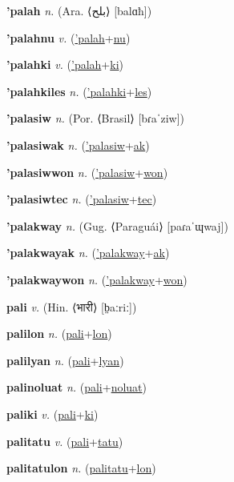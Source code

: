\textbf{\hypertarget{'palah}{'palah}} \textit{n.} (Ara. ⟨{\arabics{}بلح}⟩ [balɑħ])


\textbf{\hypertarget{'palahnu}{'palahnu}} \textit{v.} (\hyperlink{'palah}{'palah}+\allowbreak \hyperlink{nu}{nu})


\textbf{\hypertarget{'palahki}{'palahki}} \textit{v.} (\hyperlink{'palah}{'palah}+\allowbreak \hyperlink{ki}{ki})


\textbf{\hypertarget{'palahkiles}{'palahkiles}} \textit{n.} (\hyperlink{'palahki}{'palahki}+\allowbreak \hyperlink{les}{les})


\textbf{\hypertarget{'palasiw}{'palasiw}} \textit{n.} (Por. ⟨Brasil⟩ [bɾaˈziw])


\textbf{\hypertarget{'palasiwak}{'palasiwak}} \textit{n.} (\hyperlink{'palasiw}{'palasiw}+\allowbreak \hyperlink{ak}{ak})


\textbf{\hypertarget{'palasiwwon}{'palasiwwon}} \textit{n.} (\hyperlink{'palasiw}{'palasiw}+\allowbreak \hyperlink{won}{won})


\textbf{\hypertarget{'palasiwtec}{'palasiwtec}} \textit{n.} (\hyperlink{'palasiw}{'palasiw}+\allowbreak \hyperlink{tec}{tec})


\textbf{\hypertarget{'palakway}{'palakway}} \textit{n.} (Gug. ⟨Paraguái⟩ [paɾaˈɰwaj])


\textbf{\hypertarget{'palakwayak}{'palakwayak}} \textit{n.} (\hyperlink{'palakway}{'palakway}+\allowbreak \hyperlink{ak}{ak})


\textbf{\hypertarget{'palakwaywon}{'palakwaywon}} \textit{n.} (\hyperlink{'palakway}{'palakway}+\allowbreak \hyperlink{won}{won})


\textbf{\hypertarget{pali}{pali}} \textit{v.} (Hin. ⟨{\devanagari{}भारी}⟩ [b̤aːriː])


\textbf{\hypertarget{palilon}{palilon}} \textit{n.} (\hyperlink{pali}{pali}+\allowbreak \hyperlink{lon}{lon})


\textbf{\hypertarget{palilyan}{palilyan}} \textit{n.} (\hyperlink{pali}{pali}+\allowbreak \hyperlink{lyan}{lyan})


\textbf{\hypertarget{palinoluat}{palinoluat}} \textit{n.} (\hyperlink{pali}{pali}+\allowbreak \hyperlink{noluat}{noluat})


\textbf{\hypertarget{paliki}{paliki}} \textit{v.} (\hyperlink{pali}{pali}+\allowbreak \hyperlink{ki}{ki})


\textbf{\hypertarget{palitatu}{palitatu}} \textit{v.} (\hyperlink{pali}{pali}+\allowbreak \hyperlink{tatu}{tatu})


\textbf{\hypertarget{palitatulon}{palitatulon}} \textit{n.} (\hyperlink{palitatu}{palitatu}+\allowbreak \hyperlink{lon}{lon})


